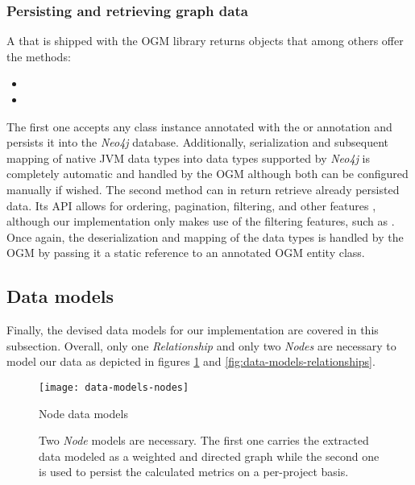 \documentclass[12pt,a4paper]{report}
\begin{document}
\subsubsection{Persisting and retrieving graph data}
A  that is shipped with the OGM library returns
 objects that among others offer the methods:
\begin{itemize}[noitemsep]
    \item {}
    \item {}
\end{itemize}
The first one accepts any class instance annotated with the 
or  annotation and persists it into the \textit{Neo4j}
database. Additionally, serialization and subsequent mapping of native JVM
data types into data types supported by \textit{Neo4j} is completely automatic
and handled by the OGM \cite{neo4j-ogm} although both can be configured manually
if wished.
The second method can in return retrieve already persisted data.
Its API allows for ordering, pagination, filtering, and other features \cite{neo4j-ogm},
although our implementation only makes use of the filtering features, such as
.
Once again, the deserialization and mapping of the data types is handled by
the OGM by passing it a static reference to an annotated OGM entity class.


\subsection{Data models} \label{subsect:data-models}

Finally, the devised data models for our implementation are covered in this subsection.
Overall, only one \textit{Relationship} and only two \textit{Nodes} are necessary
to model our data as depicted in figures \ref{fig:data-models-nodes} and
\ref{fig:data-models-relationships}.

\begin{figure}[htbp]
\centering
\texttt{[image: data-models-nodes]}
\caption{Node data models}
\caption*{
  Two \textit{Node} models are necessary. The first one carries the extracted
  data modeled as a weighted and directed graph while the second one is used
  to persist the calculated metrics on a per\hyp project basis.
}
\label{fig:data-models-nodes}
\end{figure}
\end{document}
